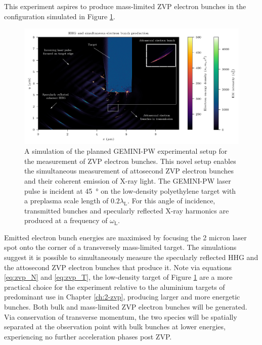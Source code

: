 This experiment aspires to produce mass-limited ZVP electron bunches in the configuration simulated in Figure \ref{fig:experimentsetuphhgbunches2}. %
\begin{figure}
	\centering
	\includegraphics[width=1\linewidth]{figures/zvp/Experiment_setup_HHG_bunches2}
	\caption[Planned GEMINI-PW experimental setup for the measurement of ZVP electron bunches.]{A simulation of the planned GEMINI-PW experimental setup for the measurement of ZVP electron bunches. This novel setup enables the simultaneous measurement of attosecond ZVP electron bunches and their coherent emission of X-ray light. The GEMINI-PW laser pulse is incident at \qty{45}{\degree} on the low-density polyethylene target with a preplasma scale length of $0.2\lambda_\mathrm{L}$. For this angle of incidence, transmitted bunches and specularly reflected X-ray harmonics are produced at a frequency of $\omega_\mathrm{L}$.}
	\label{fig:experimentsetuphhgbunches2}
\end{figure}
Emitted electron bunch energies are maximised by focusing the 2 micron laser spot onto the corner of a transversely mass-limited target. The simulations suggest it is possible to simultaneously measure the specularly reflected \ac{HHG} and the attosecond ZVP electron bunches that produce it. Note via equations \ref{eq:zvp_N} and \ref{eq:zvp_T}, the low-density target of Figure \ref{fig:experimentsetuphhgbunches2} are a more practical choice for the experiment relative to the aluminium targets of predominant use in Chapter \ref{ch:2-zvp}, producing larger and more energetic bunches. Both bulk and mass-limited ZVP electron bunches will be generated. Via conservation of transverse momentum, the two species will be spatially separated at the observation point with bulk bunches at lower energies, experiencing no further acceleration phases post ZVP.

